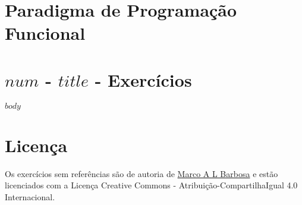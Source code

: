 \documentclass[a4paper,11pt]{article}
\begin{document}
\pagestyle{empty}

\section{Paradigma de Programação Funcional}

\section{$num$ - $title$ - Exercícios}

$body$

\section{Licença}

\begin{center}
Os exercícios sem referências são de autoria de \href{malbarbo.pro.br}{Marco A
L Barbosa} e estão licenciados com a Licença Creative Commons -
Atribuição-CompartilhaIgual 4.0 Internacional.

\href{http://creativecommons.org/licenses/by-sa/4.0/}{\ccbysa}
\end{center}
\end{document}

